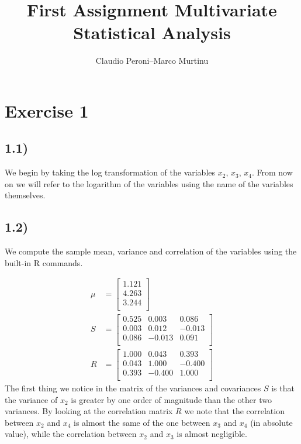 \documentclass[a4paper,11pt,oneside]{report}
\title{First Assignment Multivariate Statistical Analysis}
\author{Claudio Peroni--Marco Murtinu}
\date{}
\begin{document}
\maketitle

\section*{Exercise 1}
\subsection*{1.1)}
	We begin by taking the log transformation of the variables $x_2$, $x_3$, $x_4$.
	From now on we will refer to the logarithm of the variables using the name of the variables themselves.

\subsection*{1.2)}
	We compute the sample mean, variance and correlation of the variables using the built-in R commands.

	\begin{align}
	\mu &= 
	\begin{bmatrix}
	  1.121 \\ 
	  4.263 \\ 
	  3.244 \\ 
	   \end{bmatrix}\\
	S &=
	\begin{bmatrix}
	  0.525 & 0.003 & 0.086 \\ 
	  0.003 & 0.012 & -0.013 \\ 
	  0.086 & -0.013 & 0.091 \\ 
	   \end{bmatrix}\\
	R &= \begin{bmatrix}
	  1.000 & 0.043 & 0.393 \\ 
	  0.043 & 1.000 & -0.400 \\ 
	  0.393 & -0.400 & 1.000 \\ 
	   \end{bmatrix}
	\end{align}
	The first thing we notice in the matrix of the variances and covariances $S$ is that the variance of $x_2$ is greater by one order of magnitude than the other two variances.
	By looking at the correlation matrix $R$ we note that the correlation between $x_2$ and $x_4$ is almost the same of the one between $x_3$ and $x_4$ (in absolute value), while the correlation between $x_2$ and $x_3$ is almost negligible.
\end{document}
